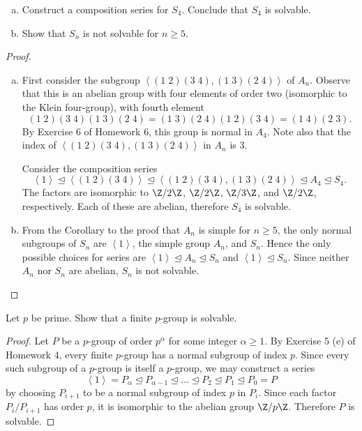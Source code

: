 \documentclass[10pt]{amsart}
\begin{document}
\begin{thm}
  \begin{enumerate}[(a)]
  \item
    Construct a composition series for $S_4$.
    Conclude that $S_4$ is solvable.
  \item
    Show that $S_n$ is not solvable for $n \geq 5$.
  \end{enumerate}
  \begin{proof}
    \begin{enumerate}[(a)]
    \item
      First consider the subgroup $\left<\left(1 \; 2\right)\left( 3 \; 4\right),  \left(1 \; 3\right)\left( 2 \; 4\right)\right>$ of $A_n$.
      Observe that this is an abelian group with four elements of order two (isomorphic to the Klein four-group), with fourth element $$\left(1 \; 2\right)\left( 3 \; 4\right)\left(1 \; 3\right)\left( 2 \; 4\right) = \left(1 \; 3\right)\left( 2 \; 4\right)\left(1 \; 2\right)\left( 3 \; 4\right) = \left(1 \; 4\right)\left( 2 \; 3\right).$$
      By Exercise 6 of Homework 6, this group is normal in $A_4$.
      Note also that the index of $\left<\left(1 \; 2\right)\left( 3 \; 4\right),  \left(1 \; 3\right)\left( 2 \; 4\right)\right>$ in $A_n$ is 3.
      
      Consider the composition series 
      $$\left<1\right> \unlhd \left<\left(1 \; 2\right)\left( 3 \; 4\right)\right> \unlhd \left<\left(1 \; 2\right)\left( 3 \; 4\right),  \left(1 \; 3\right)\left( 2 \; 4\right)\right> \unlhd A_4 \unlhd S_4.$$
      The factors are isomorphic to $\Z/2\Z$, $\Z/2\Z$, $\Z/3\Z$, and $\Z/2\Z$, respectively.
      Each of these are abelian, therefore $S_4$ is solvable.
    \item
      From the Corollary to the proof that $A_n$ is simple for $n \geq 5$, the only normal subgroups of $S_n$ are $\left< 1 \right>$, the simple group $A_n$, and $S_n$.
      Hence the only possible choices for series are $\left< 1 \right> \unlhd A_n \unlhd S_n$ and $\left< 1 \right> \unlhd S_n$.
      Since neither $A_n$ nor $S_n$ are abelian, $S_n$ is not solvable. 
    \end{enumerate}
  \end{proof}
\end{thm}

\begin{thm}
  Let $p$ be prime.
  Show that a finite $p$-group is solvable.
  \begin{proof}
    Let $P$ be a $p$-group of order $p^\alpha$ for some integer $\alpha \geq 1$.
    By Exercise 5 (e) of Homework 4, every finite $p$-group has a normal subgroup of index $p$.
    Since every such subgroup of a $p$-group is itself a $p$-group, we may construct a series
    $$\left<1\right> = P_\alpha \unlhd P_{\alpha-1} \unlhd \ldots \unlhd P_2 \unlhd P_1 \unlhd P_0 = P$$
    by choosing $P_{i+1}$ to be a normal subgroup of index $p$ in $P_i$.
    Since each factor $P_i / P_{i+1}$ has order $p$, it is isomorphic to the abelian group $\Z/p\Z$.
    Therefore $P$ is solvable.
  \end{proof}
\end{thm}
\end{document}
